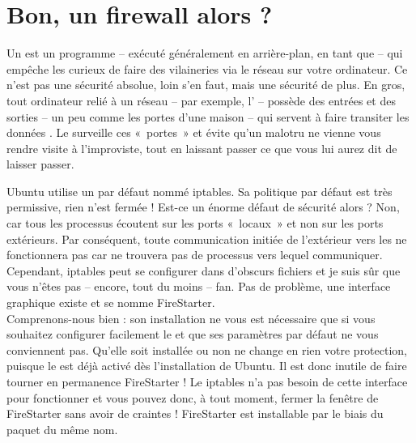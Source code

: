 \section{Bon, un firewall alors ?}
Un  est un programme -- exécuté généralement en arrière-plan, en tant que  -- qui empêche les curieux de faire des vilaineries via le réseau sur votre ordinateur. Ce n'est pas une sécurité absolue, loin s'en faut, mais une sécurité de plus. En gros, tout ordinateur relié à un réseau -- par exemple, l' -- possède des entrées et des sorties -- un peu comme les portes d'une maison -- qui servent à faire transiter les données . Le  surveille ces «~portes~» et évite qu'un malotru ne vienne vous rendre visite à l'improviste, tout en laissant passer ce que vous lui aurez dit de laisser passer.\par
Ubuntu utilise un  par défaut nommé iptables. Sa politique par défaut est très permissive, rien n'est fermée ! Est-ce un énorme défaut de sécurité alors ? Non, car tous les processus écoutent sur les ports «~locaux~» et non sur les ports extérieurs. Par conséquent, toute communication initiée de l'extérieur vers les  ne fonctionnera pas car ne trouvera pas de processus vers lequel communiquer. Cependant, iptables peut se configurer dans d'obscurs fichiers  et je suis sûr que vous n'êtes pas -- encore, tout du moins -- fan. Pas de problème, une interface graphique existe et se nomme FireStarter.\\
Comprenons-nous bien : son installation ne vous est nécessaire que si vous souhaitez configurer facilement le  et que ses paramètres par défaut ne vous conviennent pas. Qu'elle soit installée ou non ne change en rien votre protection, puisque le  est déjà activé dès l'installation de Ubuntu. Il est donc inutile de faire tourner en permanence FireStarter ! Le  iptables n'a pas besoin de cette interface pour fonctionner et vous pouvez donc, à tout moment, fermer la fenêtre de FireStarter sans avoir de craintes ! FireStarter est installable par le biais du paquet du même nom.
